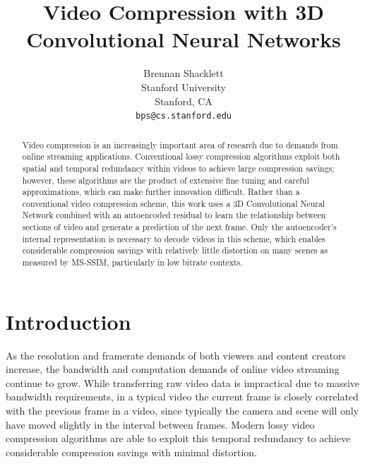 \documentclass[10pt,twocolumn,letterpaper]{article}
\begin{document}
\title{Video Compression with 3D Convolutional Neural Networks}

\author{Brennan Shacklett\\
Stanford University\\
Stanford, CA\\
{\tt\small bps@cs.stanford.edu}
}

\maketitle

\begin{abstract}
  Video compression is an increasingly important area of research due to demands from online streaming applications. Conventional lossy compression algorithms exploit both spatial and temporal redundancy within videos to achieve large compression savings; however, these algorithms are the product of extensive fine tuning and careful approximations, which can make further innovation difficult. Rather than a conventional video compression scheme, this work uses a 3D Convolutional Neural Network combined with an autoencoded residual to learn the relationship between sections of video and generate a prediction of the next frame. Only the autoencoder's internal representation is necessary to decode videos in this scheme, which enables considerable compression savings with relatively little distortion on many scenes as measured by MS-SSIM, particularly in low bitrate contexts.
\end{abstract}

\section{Introduction}

As the resolution and framerate demands of both viewers and content creators increase, the bandwidth and computation demands of online video streaming continue to grow. While transferring raw video data is impractical due to massive bandwidth requirements, in a typical video the current frame is closely correlated with the previous frame in a video, since typically the camera and scene will only have moved slightly in the interval between frames. Modern lossy video compression algorithms are able to exploit this temporal redundancy to achieve considerable compression savings with minimal distortion.
\end{document}
